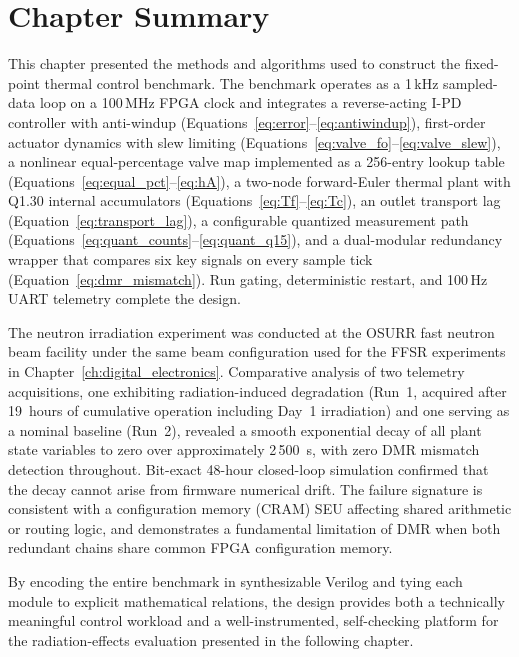 \section{Chapter Summary}
\label{sec:bench_summary}

This chapter presented the methods and algorithms used to construct the
fixed-point thermal control benchmark.  The benchmark operates as a
1\,kHz sampled-data loop on a 100\,MHz FPGA clock and integrates a
reverse-acting I-PD controller with anti-windup
(Equations~\ref{eq:error}--\ref{eq:antiwindup}), first-order actuator
dynamics with slew limiting
(Equations~\ref{eq:valve_fo}--\ref{eq:valve_slew}), a nonlinear
equal-percentage valve map implemented as a 256-entry lookup table
(Equations~\ref{eq:equal_pct}--\ref{eq:hA}), a two-node
forward-Euler thermal plant with Q1.30 internal accumulators
(Equations~\ref{eq:Tf}--\ref{eq:Tc}), an outlet transport lag
(Equation~\ref{eq:transport_lag}), a configurable quantized measurement
path (Equations~\ref{eq:quant_counts}--\ref{eq:quant_q15}), and a
dual-modular redundancy wrapper that compares six key signals on every
sample tick (Equation~\ref{eq:dmr_mismatch}).  Run gating, deterministic
restart, and 100\,Hz UART telemetry complete the design.

The neutron irradiation experiment was conducted at the OSURR fast
neutron beam facility under the same beam configuration used for the
FFSR experiments in Chapter~\ref{ch:digital_electronics}.  Comparative analysis of
two telemetry acquisitions, one exhibiting radiation-induced degradation
(Run~1, acquired after 19~hours of cumulative operation including Day~1
irradiation) and one serving as a nominal baseline (Run~2), revealed a
smooth exponential decay of all plant state variables to zero over
approximately 2\,500~s, with zero DMR mismatch detection throughout.
Bit-exact 48-hour closed-loop simulation confirmed that the decay cannot
arise from firmware numerical drift.  The failure signature is consistent
with a configuration memory (CRAM) SEU affecting shared arithmetic or
routing logic, and demonstrates a fundamental limitation of DMR when both
redundant chains share common FPGA configuration memory.

By encoding the entire
benchmark in synthesizable Verilog and tying each module to explicit
mathematical relations, the design provides both a technically
meaningful control workload and a well-instrumented, self-checking
platform for the radiation-effects evaluation presented in the following
chapter.